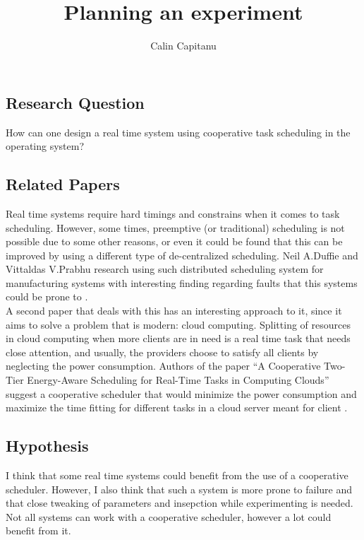 \documentclass[english]{report}
\begin{document}
\title{Planning an experiment}
\author{Calin Capitanu}

\maketitle

\clearpage
\chapter{}
\section{Research Question}
How can one design a real time system using cooperative task scheduling in the operating system?

\section{Related Papers}
Real time systems require hard timings and constrains when it comes to task scheduling. However, some times, preemptive (or traditional) scheduling is not possible due to some other reasons, or even it could be found that this can be improved by using a different type of de-centralized scheduling. Neil A.Duffie and Vittaldas V.Prabhu research using such distributed scheduling system for manufacturing systems with interesting finding regarding faults that this systems could be prone to \cite{cite1}.\\
A second paper that deals with this has an interesting approach to it, since it aims to solve a problem that is modern: cloud computing. Splitting of resources in cloud computing when more clients are in need is a real time task that needs close attention, and usually, the providers choose to satisfy all clients by neglecting the power consumption. Authors of the paper ``A Cooperative Two-Tier Energy-Aware Scheduling for Real-Time Tasks in Computing Clouds'' suggest a cooperative scheduler that would minimize the power consumption and maximize the time fitting for different tasks in a cloud server meant for client \cite{cite2}.

\section{Hypothesis}

I think that some real time systems could benefit from the use of a cooperative scheduler. However, I also think that such a system is more prone to failure and that close tweaking of parameters and insepction while experimenting is needed. Not all systems can work with a cooperative scheduler, however a lot could benefit from it.
\end{document}
